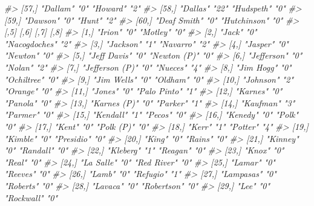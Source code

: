 \documentclass[
  12pt,
  openany]{book}
\newenvironment{Shaded}{\begin{snugshade}}{\end{snugshade}}
\newcommand{\CommentTok}[1]{\textcolor[rgb]{0.37,0.37,0.37}{\textit{#1}}}
\begin{document}
\begin{Shaded}
\begin{Highlighting}[]
\CommentTok{\#\textgreater{} [57,] "Dallam"        "0"  "Howard"      "2" }
\CommentTok{\#\textgreater{} [58,] "Dallas"        "22" "Hudspeth"    "0" }
\CommentTok{\#\textgreater{} [59,] "Dawson"        "0"  "Hunt"        "2" }
\CommentTok{\#\textgreater{} [60,] "Deaf Smith"    "0"  "Hutchinson"  "0" }
\CommentTok{\#\textgreater{}       [,5]            [,6] [,7]            [,8]}
\CommentTok{\#\textgreater{}  [1,] "Irion"         "0"  "Motley"        "0" }
\CommentTok{\#\textgreater{}  [2,] "Jack"          "0"  "Nacogdoches"   "2" }
\CommentTok{\#\textgreater{}  [3,] "Jackson"       "1"  "Navarro"       "2" }
\CommentTok{\#\textgreater{}  [4,] "Jasper"        "0"  "Newton"        "0" }
\CommentTok{\#\textgreater{}  [5,] "Jeff Davis"    "0"  "Newton (P)"    "0" }
\CommentTok{\#\textgreater{}  [6,] "Jefferson"     "0"  "Nolan"         "2" }
\CommentTok{\#\textgreater{}  [7,] "Jefferson (P)" "0"  "Nueces"        "4" }
\CommentTok{\#\textgreater{}  [8,] "Jim Hogg"      "0"  "Ochiltree"     "0" }
\CommentTok{\#\textgreater{}  [9,] "Jim Wells"     "0"  "Oldham"        "0" }
\CommentTok{\#\textgreater{} [10,] "Johnson"       "2"  "Orange"        "0" }
\CommentTok{\#\textgreater{} [11,] "Jones"         "0"  "Palo Pinto"    "1" }
\CommentTok{\#\textgreater{} [12,] "Karnes"        "0"  "Panola"        "0" }
\CommentTok{\#\textgreater{} [13,] "Karnes (P)"    "0"  "Parker"        "1" }
\CommentTok{\#\textgreater{} [14,] "Kaufman"       "3"  "Parmer"        "0" }
\CommentTok{\#\textgreater{} [15,] "Kendall"       "1"  "Pecos"         "0" }
\CommentTok{\#\textgreater{} [16,] "Kenedy"        "0"  "Polk"          "0" }
\CommentTok{\#\textgreater{} [17,] "Kent"          "0"  "Polk (P)"      "0" }
\CommentTok{\#\textgreater{} [18,] "Kerr"          "1"  "Potter"        "4" }
\CommentTok{\#\textgreater{} [19,] "Kimble"        "0"  "Presidio"      "0" }
\CommentTok{\#\textgreater{} [20,] "King"          "0"  "Rains"         "0" }
\CommentTok{\#\textgreater{} [21,] "Kinney"        "0"  "Randall"       "0" }
\CommentTok{\#\textgreater{} [22,] "Kleberg"       "1"  "Reagan"        "0" }
\CommentTok{\#\textgreater{} [23,] "Knox"          "0"  "Real"          "0" }
\CommentTok{\#\textgreater{} [24,] "La Salle"      "0"  "Red River"     "0" }
\CommentTok{\#\textgreater{} [25,] "Lamar"         "0"  "Reeves"        "0" }
\CommentTok{\#\textgreater{} [26,] "Lamb"          "0"  "Refugio"       "1" }
\CommentTok{\#\textgreater{} [27,] "Lampasas"      "0"  "Roberts"       "0" }
\CommentTok{\#\textgreater{} [28,] "Lavaca"        "0"  "Robertson"     "0" }
\CommentTok{\#\textgreater{} [29,] "Lee"           "0"  "Rockwall"      "0" }

\end{Highlighting}
\end{Shaded}
\end{document}
